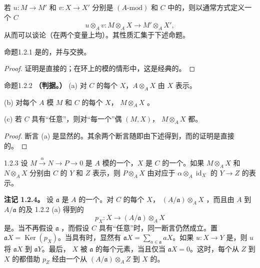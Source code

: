 若 $u:M\to M'$ 和 $v:X\to X'$ 分别是 $(A\text{-}\mathrm{mod})$ 和 $C$ 中的，则以通常方式定义一个 $C$ 
\[
u\otimes_A v:M\otimes_A X\longrightarrow M'\otimes_A X',
\]
从而可以谈论（在两个变量上均）。其性质汇集于下述命题。
\begin{SGAresult}{命题}{1.2.1}
是的，并与交换。
\end{SGAresult}
\begin{proof}证明是直接的；在环上的模的情形中，这是经典的。\end{proof}
\begin{SGAresult}{命题}{1.2.2}
\textbf{（判据。）}
(a) 对 $C$ 的每个 $X$，$A\otimes_A X$ 由 $X$ 表示。

(b) 对每个 $A$ 模 $M$ 和 $C$ 的每个 $X$， $M\otimes_A X$ 。

(c) 若 $C$ 具有“任意”，则对“每一个”偶 $(M,X)$， $M\otimes_A X$ 都。
\end{SGAresult}
\begin{proof}断言 (a) 是显然的。其余两个断言随即由下述得到，而的证明是直接的。\end{proof}
\begin{SGAresult}{}{1.2.3}
设 $M\xrightarrow{\alpha}N\to P\to0$ 是 $A$ 模的一个，$X$ 是 $C$ 的一个。如果 $M\otimes_A X$ 和 $N\otimes_A X$ 分别由 $C$ 的 $Y$ 和 $Z$ 表示，则 $P\otimes_A X$ 由对应于 $\alpha\otimes_A\operatorname{id}_X$ 的 $Y\to Z$ 的表示。
\end{SGAresult}
\textbf{注记 1.2.4。} 设 $\mathfrak a$ 是 $A$ 的一个。对 $C$ 的每个 $X$， $(A/\mathfrak a)\otimes_A X$ ，而且由 $A$ 到 $A/\mathfrak a$ 的及 1.2.2 (a) 得到的
\[
p_X:X\longrightarrow(A/\mathfrak a)\otimes_A X
\]
是。当不再假设 $\mathfrak a$ ，而假设 $C$ 具有“任意”时，同一断言仍然成立。置 $\mathfrak aX=\operatorname{Ker}(p_X)$。当具有时，显然有 $\mathfrak aX=\sum_{a\in\mathfrak a}aX$。如果 $u:X\to Y$ 是，则 $u$ 将 $\mathfrak aX$ 到 $\mathfrak aY$。最后， $X$ 被 $\mathfrak a$ 的每个元素，当且仅当 $\mathfrak aX=0$。这时，每个从 $Z$ 到 $X$ 的都借助 $p_Z$ 经由一个从 $(A/\mathfrak a)\otimes_A Z$ 到 $X$ 的。
